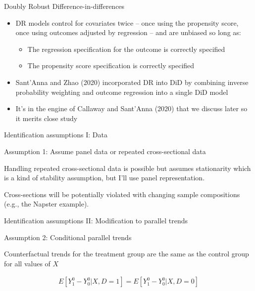 \documentclass{beamer}
\begin{document}
\begin{frame}{Doubly Robust Difference-in-differences}

\begin{itemize}
\item DR models control for covariates twice -- once using the propensity score, once using outcomes adjusted by regression -- and are unbiased so long as:
	\begin{itemize}
	\item The regression specification for the outcome is correctly specified
	\item The propensity score specification is correctly specified
	\end{itemize}
\item Sant'Anna and Zhao (2020) incorporated DR into DiD by combining inverse probability weighting and outcome regression into a single DiD model
\item It's in the engine of Callaway and Sant'Anna (2020) that we discuss later so it merits close study
\end{itemize}

\end{frame}




\begin{frame}{Identification assumptions I: Data}

Assumption 1: Assume panel data or repeated cross-sectional data

\bigskip

Handling repeated cross-sectional data is possible but assumes stationarity which is a kind of stability assumption, but I'll use panel representation. 

\bigskip

Cross-sections will be potentially violated with changing sample compositions (e.g., the Napster example). 

\end{frame}

\begin{frame}{Identification assumptions II: Modification to parallel trends}

Assumption 2: Conditional parallel trends

\bigskip

Counterfactual trends for the treatment group are the same as the control group for all values of $X$

\begin{eqnarray*}
E[Y_1^0 - Y_0^0 | X, D=1] = E[Y^0_1 - Y^0_0 | X, D=0]
\end{eqnarray*}

\end{frame}
\end{document}
